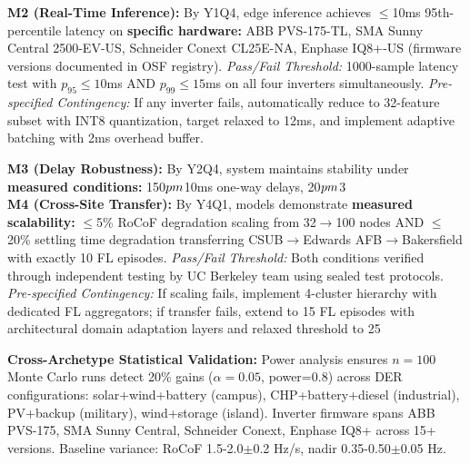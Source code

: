 \documentclass[12pt]{article}
\begin{document}
\textbf{M2 (Real-Time Inference):} By Y1Q4, edge inference achieves $\leq$10ms 95th-percentile latency on \textbf{specific hardware:} ABB PVS-175-TL, SMA Sunny Central 2500-EV-US, Schneider Conext CL25E-NA, Enphase IQ8+-US (firmware versions documented in OSF registry). \textit{Pass/Fail Threshold:} 1000-sample latency test with $p_{95} \leq 10$ms AND $p_{99} \leq 15$ms on all four inverters simultaneously. \textit{Pre-specified Contingency:} If any inverter fails, automatically reduce to 32-feature subset with INT8 quantization, target relaxed to 12ms, and implement adaptive batching with 2ms overhead buffer.

\textbf{M3 (Delay Robustness):} By Y2Q4, system maintains stability under \textbf{measured conditions:} 150$\\pm$10ms one-way delays, 20$\\pm$3\\%

\textbf{M4 (Cross-Site Transfer):} By Y4Q1, models demonstrate \textbf{measured scalability:} $\leq$5\% RoCoF degradation scaling from 32$\rightarrow$100 nodes AND $\leq$20\% settling time degradation transferring CSUB$\rightarrow$Edwards AFB$\rightarrow$Bakersfield with exactly 10 FL episodes. \textit{Pass/Fail Threshold:} Both conditions verified through independent testing by UC Berkeley team using sealed test protocols. \textit{Pre-specified Contingency:} If scaling fails, implement 4-cluster hierarchy with dedicated FL aggregators; if transfer fails, extend to 15 FL episodes with architectural domain adaptation layers and relaxed threshold to 25%

\textbf{Cross-Archetype Statistical Validation:} Power analysis ensures $n=100$ Monte Carlo runs detect 20\% gains ($\alpha=0.05$, power=0.8) across DER configurations: solar+wind+battery (campus), CHP+battery+diesel (industrial), PV+backup (military), wind+storage (island). Inverter firmware spans ABB PVS-175, SMA Sunny Central, Schneider Conext, Enphase IQ8+ across 15+ versions. Baseline variance: RoCoF 1.5-2.0$\pm$0.2 Hz/s, nadir 0.35-0.50$\pm$0.05 Hz.
\end{document}
